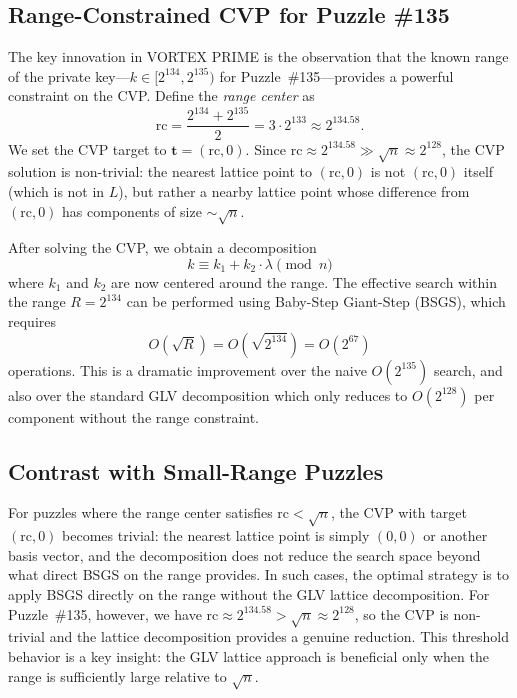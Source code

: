 \documentclass[11pt,a4paper]{article}
\theoremstyle{definition}
\begin{document}
\subsection{Range-Constrained CVP for Puzzle \#135}

The key innovation in VORTEX PRIME is the observation that the known range of the private key---$k \in [2^{134}, 2^{135})$ for Puzzle~\#135---provides a powerful constraint on the CVP. Define the \emph{range center} as
\begin{equation}
  \mathrm{rc} = \frac{2^{134} + 2^{135}}{2} = 3 \cdot 2^{133} \approx 2^{134.58}.
  \label{eq:range-center}
\end{equation}
We set the CVP target to $\mathbf{t} = (\mathrm{rc}, 0)$. Since $\mathrm{rc} \approx 2^{134.58} \gg \sqrt{n} \approx 2^{128}$, the CVP solution is non-trivial: the nearest lattice point to $(\mathrm{rc}, 0)$ is not $(\mathrm{rc}, 0)$ itself (which is not in $L$), but rather a nearby lattice point whose difference from $(\mathrm{rc}, 0)$ has components of size $\sim \sqrt{n}$.

After solving the CVP, we obtain a decomposition
\begin{equation}
  k \equiv k_1 + k_2 \cdot \lambda \pmod{n}
  \label{eq:range-glv-decomp}
\end{equation}
where $k_1$ and $k_2$ are now centered around the range. The effective search within the range $R = 2^{134}$ can be performed using Baby-Step Giant-Step (BSGS), which requires
\begin{equation}
  O(\sqrt{R}) = O\left(\sqrt{2^{134}}\right) = O(2^{67})
  \label{eq:bsgs-range}
\end{equation}
operations. This is a dramatic improvement over the naive $O(2^{135})$ search, and also over the standard GLV decomposition which only reduces to $O(2^{128})$ per component without the range constraint.

\subsection{Contrast with Small-Range Puzzles}

For puzzles where the range center satisfies $\mathrm{rc} < \sqrt{n}$, the CVP with target $(\mathrm{rc}, 0)$ becomes trivial: the nearest lattice point is simply $(0, 0)$ or another basis vector, and the decomposition does not reduce the search space beyond what direct BSGS on the range provides. In such cases, the optimal strategy is to apply BSGS directly on the range without the GLV lattice decomposition. For Puzzle~\#135, however, we have $\mathrm{rc} \approx 2^{134.58} > \sqrt{n} \approx 2^{128}$, so the CVP is non-trivial and the lattice decomposition provides a genuine reduction. This threshold behavior is a key insight: the GLV lattice approach is beneficial only when the range is sufficiently large relative to $\sqrt{n}$.
\end{document}
